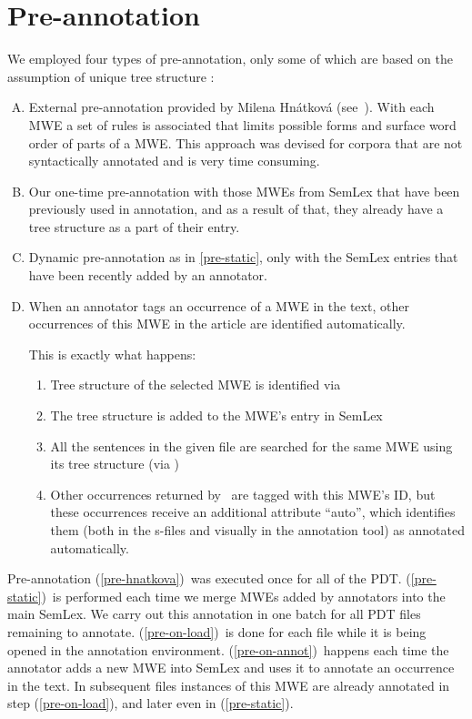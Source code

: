 \section{Pre-annotation}
\label{sec:annot:pre}
We employed four types of pre-annotation, only some of which are based on the assumption of unique tree structure :
\begin{enumerate}[A)]

\item \label{pre-hnatkova}External pre-annotation provided by Milena Hnátková (see~\citealp{hnatkova:2002}). With each MWE a set of rules is associated that limits possible forms and surface word order of parts of a MWE. This approach was devised for corpora that are not syntactically annotated and is very time consuming.

\item \label{pre-static}Our one-time pre-annotation with those MWEs from SemLex that have been previously used in annotation, and as a result of that, they already have a tree structure as a part of their entry.

\item \label{pre-on-load}Dynamic pre-annotation as in \ref{pre-static}, only with the SemLex entries that have been recently added by an annotator. 

\item \label{pre-on-annot}When an annotator tags an occurrence of a MWE in the text, other occurrences of this MWE in the article are identified automatically.

This is exactly what happens:
	\begin{enumerate}[1)]
	\item Tree structure of the selected MWE is identified via \ntred
	\item The tree structure is added to the MWE's entry in SemLex
	\item All the sentences in the given file are searched for the same MWE using its tree structure (via  \ntred)
	\item Other occurrences returned by  \ntred\ are tagged with this MWE's ID, but these occurrences receive an additional attribute ``auto'', which identifies them (both in the s-files and visually in the annotation tool) as annotated automatically.
	\end{enumerate}

\end{enumerate}

Pre-annotation (\ref{pre-hnatkova})~was executed once for all of the PDT. (\ref{pre-static})~is performed each time we merge MWEs added by annotators into the main SemLex. We carry out this annotation in one batch for all PDT files remaining to annotate. (\ref{pre-on-load})~is done for each file while it is being opened in the annotation environment. 
(\ref{pre-on-annot})~happens each time the annotator adds a new MWE into SemLex and uses it to annotate an occurrence in the text. In subsequent files instances of this MWE are already annotated in step (\ref{pre-on-load}), and later even in (\ref{pre-static}).
 
